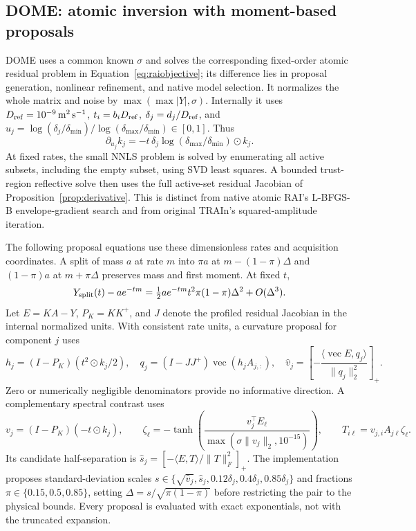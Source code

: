 \subsection{DOME: atomic inversion with moment-based proposals}\label{sec:domemath}
DOME uses a common known $\sigma$ and solves the corresponding fixed-order atomic residual problem in Equation~\eqref{eq:raiobjective}; its difference lies in proposal generation, nonlinear refinement, and native model selection. It normalizes the whole matrix and noise by $\max(\max|Y|,\sigma)$. Internally it uses $D_{\rm ref}=10^{-9}\,\mathrm{m^2\,s^{-1}}$, $t_i=b_iD_{\rm ref}$, $\delta_j=d_j/D_{\rm ref}$, and $u_j=\log(\delta_j/\delta_{\min})/\log(\delta_{\max}/\delta_{\min})\in[0,1]$. Thus
\begin{equation}\label{eq:domegradient}
 \partial_{u_j}k_j=-t\,\delta_j\log(\delta_{\max}/\delta_{\min})\odot k_j.
\end{equation}
At fixed rates, the small NNLS problem is solved by enumerating all active subsets, including the empty subset, using SVD least squares. A bounded trust-region reflective solve then uses the full active-set residual Jacobian of Proposition~\ref{prop:derivative}. This is distinct from native atomic RAI's L-BFGS-B envelope-gradient search and from original TRAIn's squared-amplitude iteration.

The following proposal equations use these dimensionless rates and acquisition coordinates. A split of mass $a$ at rate $m$ into $\pi a$ at $m-(1-\pi)\Delta$ and $(1-\pi)a$ at $m+\pi\Delta$ preserves mass and first moment. At fixed $t$,
\begin{equation}\label{eq:split}
 Y_{\rm split}(t)-ae^{-tm}
 =\tfrac12 ae^{-tm}t^2\pi(1-\pi)\Delta^2+O(\Delta^3).
\end{equation}
Let $E=KA-Y$, $P_K=KK^+$, and $J$ denote the profiled residual Jacobian in the internal normalized units. With consistent rate units, a curvature proposal for component $j$ uses
\begin{equation}\label{eq:domecurvature}
 h_j=(I-P_K)(t^2\odot k_j/2),\quad
 q_j=(I-JJ^+)\operatorname{vec}(h_j A_{j,:}),\quad
 \widehat v_j=\left[-\frac{\langle\operatorname{vec}E,q_j\rangle}{\|q_j\|_2^2}\right]_+.
\end{equation}
Zero or numerically negligible denominators provide no informative direction. A complementary spectral contrast uses
\begin{equation}\label{eq:domespectral}
 v_j=(I-P_K)(-t\odot k_j),\qquad
 \zeta_\ell=-\tanh\!\left(\frac{v_j^\top E_\ell}{\max(\sigma\|v_j\|_2,10^{-15})}\right),\qquad
 T_{i\ell}=v_{j,i}A_{j\ell}\zeta_\ell.
\end{equation}
Its candidate half-separation is $\widehat s_j=[-\langle E,T\rangle/\|T\|_F^2]_+$. The implementation proposes standard-deviation scales $s\in\{\sqrt{\widehat v_j},\widehat s_j,0.12\delta_j,0.4\delta_j,0.85\delta_j\}$ and fractions $\pi\in\{0.15,0.5,0.85\}$, setting $\Delta=s/\sqrt{\pi(1-\pi)}$ before restricting the pair to the physical bounds. Every proposal is evaluated with exact exponentials, not with the truncated expansion.

